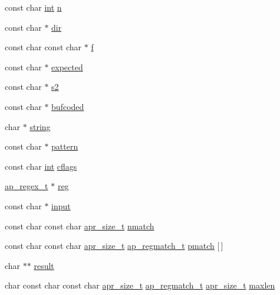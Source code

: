 \begin{DoxyCompactItemize}
\item 
const char \hyperlink{pcre_8txt_a42dfa4ff673c82d8efe7144098fbc198}{int} \hyperlink{group__APACHE__CORE__DAEMON_gabfc835ba1bb93aeecef9b949481c4a2d}{n}
\item 
const char $\ast$ \hyperlink{group__APACHE__CORE__DAEMON_ga6d902c83b02c43071b972ed0416729bc}{dir}
\item 
const char const char $\ast$ \hyperlink{group__APACHE__CORE__DAEMON_ga588c778c1c1509e472f22dc36efb005e}{f}
\item 
const char $\ast$ \hyperlink{group__APACHE__CORE__DAEMON_ga4ccff52c6aab3f0dc41108e8905ab106}{expected}
\item 
const char $\ast$ \hyperlink{group__APACHE__CORE__DAEMON_ga92f959d07c956e20e36ad44cb5de9c2e}{s2}
\item 
const char $\ast$ \hyperlink{group__APACHE__CORE__DAEMON_ga814f6d0860324eaf81b119f21031d6f4}{bufcoded}
\item 
char $\ast$ \hyperlink{group__APACHE__CORE__DAEMON_gae1adbce218e7a9d09164012443191d24}{string}
\item 
const char $\ast$ \hyperlink{group__APACHE__CORE__DAEMON_gacd28ae39c6440992e47d3da772c56602}{pattern}
\item 
const char \hyperlink{pcre_8txt_a42dfa4ff673c82d8efe7144098fbc198}{int} \hyperlink{group__APACHE__CORE__DAEMON_ga3defcfc322adaa47f01e20261c7483ff}{cflags}
\item 
\hyperlink{structap__regex__t}{ap\+\_\+regex\+\_\+t} $\ast$ \hyperlink{group__APACHE__CORE__DAEMON_gaaa6cf5bbf86c3ce1886a4de4c8b6bb51}{reg}
\item 
const char $\ast$ \hyperlink{group__APACHE__CORE__DAEMON_gaf801cc3fb2a90cf95d512d76fb498c3f}{input}
\item 
const char const char \hyperlink{group__apr__platform_gaaa72b2253f6f3032cefea5712a27540e}{apr\+\_\+size\+\_\+t} \hyperlink{group__APACHE__CORE__DAEMON_ga92a43aa0352eb452970c83ba3da95a8f}{nmatch}
\item 
const char const char \hyperlink{group__apr__platform_gaaa72b2253f6f3032cefea5712a27540e}{apr\+\_\+size\+\_\+t} \hyperlink{structap__regmatch__t}{ap\+\_\+regmatch\+\_\+t} \hyperlink{group__APACHE__CORE__DAEMON_gaa84c3b7a465311cc04c25e4998c81aec}{pmatch} \mbox{[}$\,$\mbox{]}
\item 
char $\ast$$\ast$ \hyperlink{group__APACHE__CORE__DAEMON_gaf4bf6905638893519df9fcba9d6c9a61}{result}
\item 
char const char const char \hyperlink{group__apr__platform_gaaa72b2253f6f3032cefea5712a27540e}{apr\+\_\+size\+\_\+t} \hyperlink{structap__regmatch__t}{ap\+\_\+regmatch\+\_\+t} \hyperlink{group__apr__platform_gaaa72b2253f6f3032cefea5712a27540e}{apr\+\_\+size\+\_\+t} \hyperlink{group__APACHE__CORE__DAEMON_ga396b50964961e17784202ccbefcbf25d}{maxlen}
$$
\end{DoxyCompactItemize}
